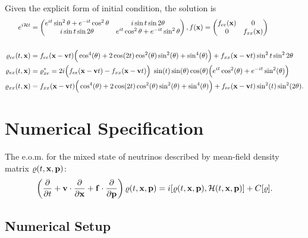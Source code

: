 \documentclass[11pt,a4paper]{article}
\begin{document}
Given the explicit form of initial condition, the solution is
\begin{align*}
   e^{i\mathcal{H}t} &= \begin{pmatrix} 
      e^{it}\sin^{2}{\theta} + e^{-it}\cos^{2}{\theta}& i\sin{t} \sin{2\theta}\\
      i\sin t  \sin 2\theta & e^{it} \cos^{2}\theta + e^{-it}\sin^{2}\theta\\
   \end{pmatrix} , 
   f(\vb{x}) = \begin{pmatrix} 
      f_{ee}(\vb{x}) & 0\\
      0 & f_{xx}(\vb{x})\\
   \end{pmatrix}\\
   \\
      \varrho_{ee}(t,\vb{x}) &=  
      f_{ee}(\vb{x} - \vb{v}t) \Big(\cos^{4}(\theta) + 2\cos (2t) \cos ^{2} (\theta) \sin^{2}(\theta) + \sin^{4} (\theta)\Big) + f_{x x}(\vb{x} - \vb{v}t)  \sin ^{2}t \sin ^{2 }2\theta \\ 
      \varrho_{ex}(t, \vb{x}) &= \varrho_{xe}^{*} = 2i \Big(f_{ee}(\vb{x} - \vb{v}t) - f_{x x} (\vb{x} - \vb{v}t)\Big) \hspace{0.1cm}\sin(t) \sin(\theta) \cos(\theta) \Big(e^{it}\cos^{2}(\theta) + e^{-it}\sin ^{2}(\theta)\Big)\\
      \varrho_{x x}(t, \vb{x}) &= f_{x x}(\vb{x} - \vb{v}t)\Big(\cos^{4}(\theta) + 2 \cos(2t) \cos^{2}(\theta) \sin^{2}(\theta)  + \sin ^{4}(\theta) \Big)  + f_{ee}(\vb{x} - \vb{v}t)\sin ^{2}(t) \sin ^{2}(2\theta)
.\end{align*}

 \section{Numerical Specification}%
 \label{sec:Numerical Simulation}

 The e.o.m. for the mixed state of neutrinos described by mean-field density matrix $\varrho(t,\vb{x}, \vb{p})$:
 \[
 \left(  \frac{\partial}{\partial t} + \vb{v}\cdot \frac{\partial}{\partial \vb{x}} + \vb{f} \cdot \frac{\partial}{\partial \vb{p}}\right) \varrho(t,\vb{x}, \vb{p}) = i \comm{\varrho (t, \vb{x}, \vb{p})}{\mathcal{H}(t, \vb{x}, \vb{p})} + C[\varrho].\] 

 \subsection{Numerical Setup}%
 \label{sub:Perturbation from an initial state}
\end{document}
